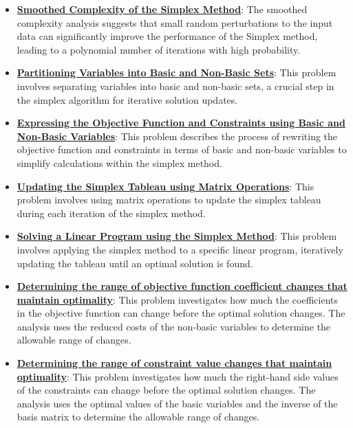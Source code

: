 \documentclass{article}%
\begin{document}
\begin{itemize}[leftmargin=*]
\item \href{https://www.math.purdue.edu/~yipn/421//2024-09-05-SimplexEfficiency.pdf#page=11}{\textbf{Smoothed Complexity of the Simplex Method}}: The smoothed complexity analysis suggests that small random perturbations to the input data can significantly improve the performance of the Simplex method, leading to a polynomial number of iterations with high probability.%
\item \href{https://www.math.purdue.edu/~yipn/421//2024-09-24-SimplexMatrix.pdf#page=4}{\textbf{Partitioning Variables into Basic and Non-Basic Sets}}: This problem involves separating variables into basic and non-basic sets, a crucial step in the simplex algorithm for iterative solution updates.%
\item \href{https://www.math.purdue.edu/~yipn/421//2024-09-24-SimplexMatrix.pdf#page=8}{\textbf{Expressing the Objective Function and Constraints using Basic and Non-Basic Variables}}: This problem describes the process of rewriting the objective function and constraints in terms of basic and non-basic variables to simplify calculations within the simplex method.%
\item \href{https://www.math.purdue.edu/~yipn/421//2024-09-24-SimplexMatrix.pdf#page=10}{\textbf{Updating the Simplex Tableau using Matrix Operations}}: This problem involves using matrix operations to update the simplex tableau during each iteration of the simplex method.%
\item \href{https://www.math.purdue.edu/~yipn/421//2024-09-24-SimplexMatrix.pdf#page=15}{\textbf{Solving a Linear Program using the Simplex Method}}: This problem involves applying the simplex method to a specific linear program, iteratively updating the tableau until an optimal solution is found.%
\item \href{https://www.math.purdue.edu/~yipn/421//2024-09-26-Sensitivity.pdf#page=4}{\textbf{Determining the range of objective function coefficient changes that maintain optimality}}: This problem investigates how much the coefficients in the objective function can change before the optimal solution changes.  The analysis uses the reduced costs of the non-basic variables to determine the allowable range of changes.%
\item \href{https://www.math.purdue.edu/~yipn/421//2024-09-26-Sensitivity.pdf#page=8}{\textbf{Determining the range of constraint value changes that maintain optimality}}: This problem investigates how much the right-hand side values of the constraints can change before the optimal solution changes. The analysis uses the optimal values of the basic variables and the inverse of the basis matrix to determine the allowable range of changes.%

\end{itemize}
\end{document}
